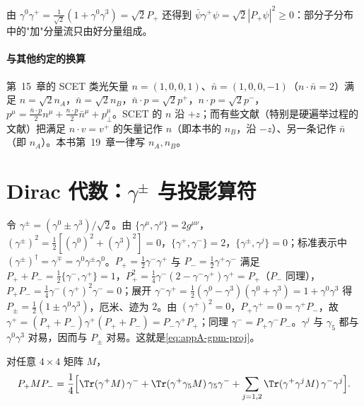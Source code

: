 由 $\gamma^0\gamma^+=\frac1{\sqrt2}(1+\gamma^0\gamma^3)=\sqrt2P_+$ 还得到 $\bar\psi\gamma^+\psi=\sqrt2|P_+\psi|^2\ge0$：部分子分布中的"加"分量流只由好分量组成。

\paragraph{与其他约定的换算}
第~15~章的 SCET 类光矢量 $n=(1,0,0,1)$、$\bar n=(1,0,0,-1)$（$n\cdot\bar n=2$）满足 $n=\sqrt2n_A$，$\bar n=\sqrt2n_B$，$\bar n\cdot p=\sqrt2p^+$，$n\cdot p=\sqrt2p^-$，$p^\mu=\frac{\bar n\cdot p}2n^\mu+\frac{n\cdot p}2\bar n^\mu+p_\perp^\mu$。SCET 的 $n$ 沿 $+z$；而有些文献（特别是硬遍举过程的文献）把满足 $n\cdot v=v^+$ 的矢量记作 $n$（即本书的 $n_B$，沿 $-z$）、另一条记作 $\bar n$（即 $n_A$）。本书第~19~章一律写 $n_A,n_B$。

\section{Dirac 代数：$\gamma^\pm$ 与投影算符}\label{sec:appA-dirac}

令 $\gamma^\pm=(\gamma^0\pm\gamma^3)/\sqrt2$。由 $\{\gamma^\mu,\gamma^\nu\}=2g^{\mu\nu}$，$(\gamma^\pm)^2=\frac12[(\gamma^0)^2+(\gamma^3)^2]=0$，$\{\gamma^+,\gamma^-\}=2$，$\{\gamma^\pm,\gamma^j\}=0$；标准表示中 $(\gamma^\pm)^\dagger=\gamma^\mp=\gamma^0\gamma^\pm\gamma^0$。$P_+=\frac12\gamma^-\gamma^+$ 与 $P_-=\frac12\gamma^+\gamma^-$ 满足 $P_++P_-=\frac12\{\gamma^-,\gamma^+\}=1$，$P_+^2=\frac14\gamma^-(2-\gamma^-\gamma^+)\gamma^+=P_+$（$P_-$ 同理），$P_+P_-=\frac14\gamma^-(\gamma^+)^2\gamma^-=0$；展开 $\gamma^-\gamma^+=\frac12(\gamma^0-\gamma^3)(\gamma^0+\gamma^3)=1+\gamma^0\gamma^3$ 得 $P_\pm=\frac12(1\pm\gamma^0\gamma^3)$，厄米、迹为 $2$。由 $(\gamma^+)^2=0$，$P_+\gamma^+=0=\gamma^+P_-$，故 $\gamma^+=(P_++P_-)\gamma^+(P_++P_-)=P_-\gamma^+P_+$；同理 $\gamma^-=P_+\gamma^-P_-$。$\gamma^j$ 与 $\gamma_5$ 都与 $\gamma^0\gamma^3$ 对易，因而与 $P_\pm$ 对易。这就是\cref{eq:appA-gpm-proj}。

\begin{lemma}[共线 Fierz 分解]\label{lem:appA-fierz}
对任意 $4\times4$ 矩阵 $M$，
\begin{equation}\label{eq:appA-fierz}
P_+MP_-=\frac14\Big[\Tr(\gamma^+M)\,\gamma^-+\Tr(\gamma^+\gamma_5M)\,\gamma_5\gamma^-+\sum_{j=1,2}\Tr(\gamma^+\gamma^jM)\,\gamma^-\gamma^j\Big]. %
\end{equation}
\end{lemma}

